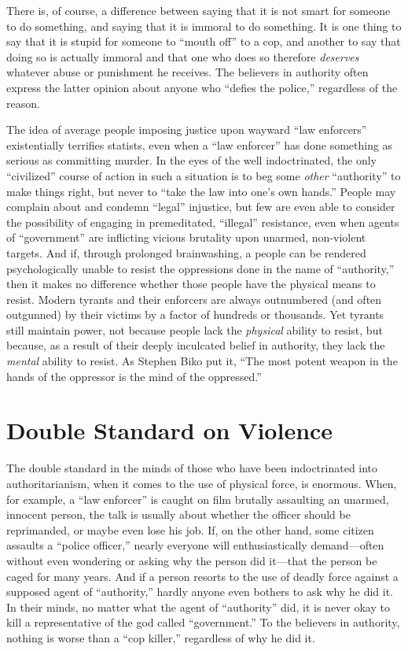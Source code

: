 \documentclass{book}
\begin{document}
There is, of course, a difference between saying that it is not smart for someone to do something, and saying that it is immoral to do something. It is one thing to say that it is stupid for someone to \enquote{mouth off} to a cop, and another to say that doing so is actually immoral and that one who does so therefore \emph{deserves} whatever abuse or punishment he receives. The believers in authority often express the latter opinion about anyone who \enquote{defies the police,} regardless of the reason.

The idea of average people imposing justice upon wayward \enquote{law enforcers} existentially terrifies statists, even when a \enquote{law enforcer} has done something as serious as committing murder. In the eyes of the well indoctrinated, the only \enquote{civilized} course of action in such a situation is to beg some \emph{other} \enquote{authority} to make things right, but never to \enquote{take the law into one's own hands.} People may complain about and condemn \enquote{legal} injustice, but few are even able to consider the possibility of engaging in premeditated, \enquote{illegal} resistance, even when agents of \enquote{government} are inflicting vicious brutality upon unarmed, non-violent targets. And if, through prolonged brainwashing, a people can be rendered psychologically unable to resist the oppressions done in the name of \enquote{authority,} then it makes no difference whether those people have the physical means to resist. Modern tyrants and their enforcers are always outnumbered (and often outgunned) by their victims by a factor of hundreds or thousands. Yet tyrants still maintain power, not because people lack the \emph{physical} ability to resist, but because, as a result of their deeply inculcated belief in authority, they lack the \emph{mental} ability to resist. As Stephen Biko put it, \enquote{The most potent weapon in the hands of the oppressor is the mind of the oppressed.}

\section{Double Standard on Violence}

The double standard in the minds of those who have been indoctrinated into authoritarianism, when it comes to the use of physical force, is enormous. When, for example, a \enquote{law enforcer} is caught on film brutally assaulting an unarmed, innocent person, the talk is usually about whether the officer should be reprimanded, or maybe even lose his job. If, on the other hand, some citizen assaults a \enquote{police officer,} nearly everyone will enthusiastically demand---often without even wondering or asking why the person did it---that the person be caged for many years. And if a person resorts to the use of deadly force against a supposed agent of \enquote{authority,} hardly anyone even bothers to ask why he did it. In their minds, no matter what the agent of \enquote{authority} did, it is never okay to kill a representative of the god called \enquote{government.} To the believers in authority, nothing is worse than a \enquote{cop killer,} regardless of why he did it.
\end{document}
